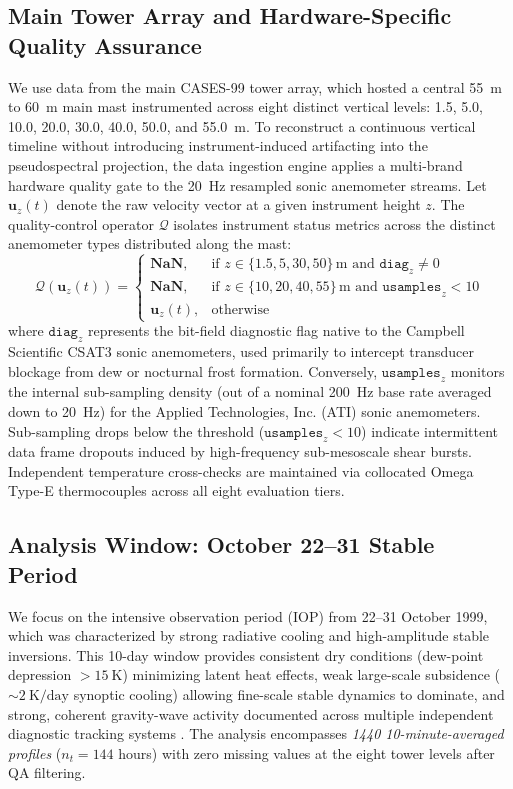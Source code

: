 \subsection{Main Tower Array and Hardware-Specific Quality Assurance}
We use data from the main CASES-99 tower array, which hosted a central \SI{55}{\meter} to \SI{60}{\meter} main mast instrumented across eight distinct vertical levels: 1.5, 5.0, 10.0, 20.0, 30.0, 40.0, 50.0, and \SI{55.0}{\meter}. To reconstruct a continuous vertical timeline without introducing instrument-induced artifacting into the pseudospectral projection, the data ingestion engine applies a multi-brand hardware quality gate to the 20~Hz resampled sonic anemometer streams. Let $\mathbf{u}_z(t)$ denote the raw velocity vector at a given instrument height $z$. The quality-control operator $\mathcal{Q}$ isolates instrument status metrics across the distinct anemometer types distributed along the mast:
\begin{equation}
\mathcal{Q}\left(\mathbf{u}_z(t)\right) =
\begin{cases}
\mathbf{NaN}, & \text{if } z \in \{1.5, 5, 30, 50\}\,\text{m and } \mathtt{diag}_z \neq 0 \\
\mathbf{NaN}, & \text{if } z \in \{10, 20, 40, 55\}\,\text{m and } \mathtt{usamples}_z < 10 \\
\mathbf{u}_z(t), & \text{otherwise}
\end{cases}
\end{equation}
where $\mathtt{diag}_z$ represents the bit-field diagnostic flag native to the Campbell Scientific CSAT3 sonic anemometers, used primarily to intercept transducer blockage from dew or nocturnal frost formation. Conversely, $\mathtt{usamples}_z$ monitors the internal sub-sampling density (out of a nominal 200~Hz base rate averaged down to 20~Hz) for the Applied Technologies, Inc. (ATI) sonic anemometers. Sub-sampling drops below the threshold ($\mathtt{usamples}_z < 10$) indicate intermittent data frame dropouts induced by high-frequency sub-mesoscale shear bursts. Independent temperature cross-checks are maintained via collocated Omega Type-E thermocouples across all eight evaluation tiers.

\subsection{Analysis Window: October 22--31 Stable Period}

We focus on the intensive observation period (IOP) from 22--31 October 1999, which was characterized by strong radiative cooling and high-amplitude stable inversions. This 10-day window provides consistent dry conditions (dew-point depression $> \SI{15}{\kelvin}$) minimizing latent heat effects, weak large-scale subsidence ($\sim \SI{2}{\kelvin\per\text{day}}$ synoptic cooling) allowing fine-scale stable dynamics to dominate, and strong, coherent gravity-wave activity documented across multiple independent diagnostic tracking systems \citep{Poulos2002}. The analysis encompasses \emph{1440 10-minute-averaged profiles} ($n_t = 144$ hours) with zero missing values at the eight tower levels after QA filtering.

